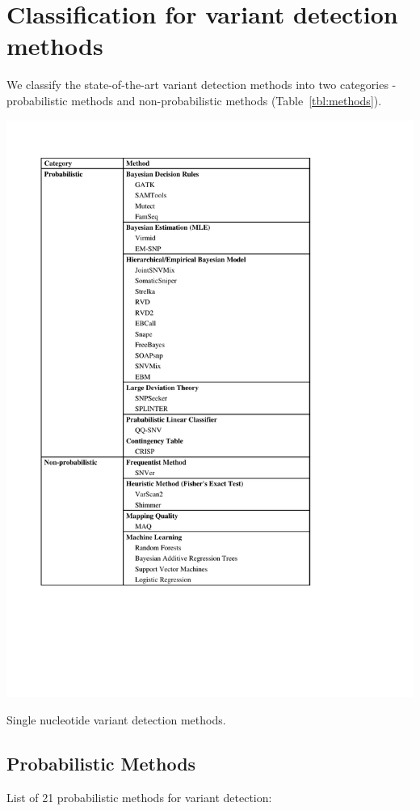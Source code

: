 \documentclass[11pt,reqno]{amsart}
\begin{document}
\section{Classification for variant detection methods}
We classify the state-of-the-art variant detection methods into two categories - probabilistic methods and non-probabilistic methods (Table~\ref{tbl:methods}).
\begin{table}[!ht]
\centering
\includegraphics[width=1.1\textwidth]{method_table.pdf}
\caption{Single nucleotide variant detection methods.}
\label{tbl:methods}
\end{table}


\subsection{Probabilistic Methods}
List of 21 probabilistic methods for variant detection:
\end{document}

